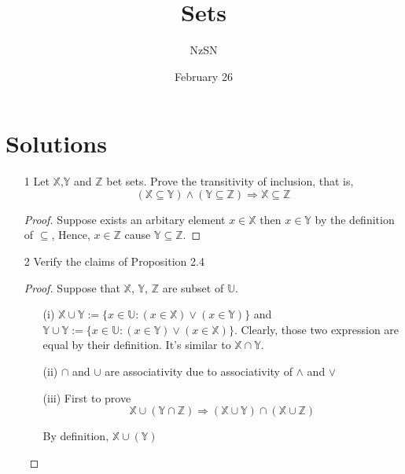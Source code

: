 \documentclass[11pt]{book}
\title{Sets}
\author{NzSN}
\date{February 26}
\newcommand{\bb}[1]{\mathbb{#1}}
\newcommand{\Ra}{\Rightarrow}
\begin{document}
\maketitle

\vspace{0.2 cm}
\section{Solutions}

\begin{enumerate}
\item[1]
        Let $\bb{X}$,$\bb{Y}$ and $\bb{Z}$ bet sets.
        Prove the transitivity of inclusion, that is,
        $$(\bb{X} \subseteq \bb{Y}) \land (\bb{Y} \subseteq \bb{Z}) \Ra \bb{X} \subseteq \bb{Z}$$
\begin{proof}
  Suppose exists an arbitary element $x \in \bb{X}$ then $x \in \bb{Y}$ by the definition of $\subseteq$,
  Hence, $x \in \bb{Z}$ cause $\bb{Y} \subseteq \bb{Z}$.
\end{proof}

\item[2]
        Verify the claims of Proposition 2.4
\begin{proof}
Suppose that $\bb{X}$, $\bb{Y}$, $\bb{Z}$ are subset of $\bb{U}$.
\begin{enumerate}
  \item[(i)]
        $\bb{X} \cup \bb{Y} := \{ x \in \bb{U} : (x \in \bb{X}) \lor (x \in \bb{Y}) \}$ and
        $\bb{Y} \cup \bb{Y} := \{ x \in \bb{U} : (x \in \bb{Y}) \lor (x \in \bb{X}) \}$.
        Clearly, those two expression are equal by their definition. It's similar to $\bb{X} \cap \bb{Y}$.
  \item[(ii)]
        $\cap$ and $\cup$ are associativity due to associativity of $\land$ and $\lor$
  \item[(iii)]
        First to prove
        $$\bb{X} \cup (\bb{Y} \cap \bb{Z}) \Ra
        (\bb{X} \cup \bb{Y}) \cap (\bb{X} \cup \bb{Z})$$

        By definition, $\bb{X} \cup (\bb{Y})$

\end{enumerate}

\end{proof}

\end{enumerate}
\end{document}
